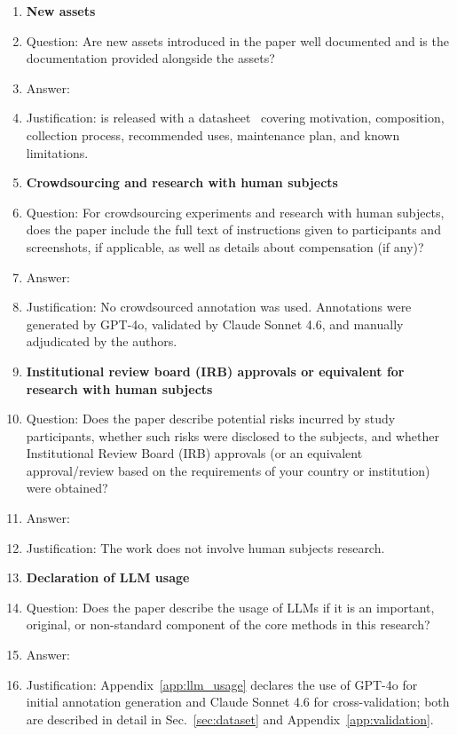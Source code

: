 \begin{enumerate}
\item {\bf New assets}
    \item[] Question: Are new assets introduced in the paper well documented and is the documentation provided alongside the assets?
    \item[] Answer: \answerYes{}
    \item[] Justification: \bench is released with a
          datasheet~\citep{datasheets} covering motivation,
          composition, collection process, recommended uses,
          maintenance plan, and known limitations.

\item {\bf Crowdsourcing and research with human subjects}
    \item[] Question: For crowdsourcing experiments and research with human subjects, does the paper include the full text of instructions given to participants and screenshots, if applicable, as well as details about compensation (if any)?
    \item[] Answer: \answerNA{}
    \item[] Justification: No crowdsourced annotation was
          used. Annotations were generated by GPT-4o, validated by
          Claude Sonnet 4.6, and manually adjudicated by the authors.

\item {\bf Institutional review board (IRB) approvals or equivalent for research with human subjects}
    \item[] Question: Does the paper describe potential risks incurred by study participants, whether such risks were disclosed to the subjects, and whether Institutional Review Board (IRB) approvals (or an equivalent approval/review based on the requirements of your country or institution) were obtained?
    \item[] Answer: \answerNA{}
    \item[] Justification: The work does not involve human
          subjects research.

\item {\bf Declaration of LLM usage}
    \item[] Question: Does the paper describe the usage of LLMs if it is an important, original, or non-standard component of the core methods in this research?
    \item[] Answer: \answerYes{}
    \item[] Justification: Appendix~\ref{app:llm_usage}
          declares the use of GPT-4o for initial annotation
          generation and Claude Sonnet 4.6 for cross-validation;
          both are described in detail in
          Sec.~\ref{sec:dataset} and
          Appendix~\ref{app:validation}.

\end{enumerate}
